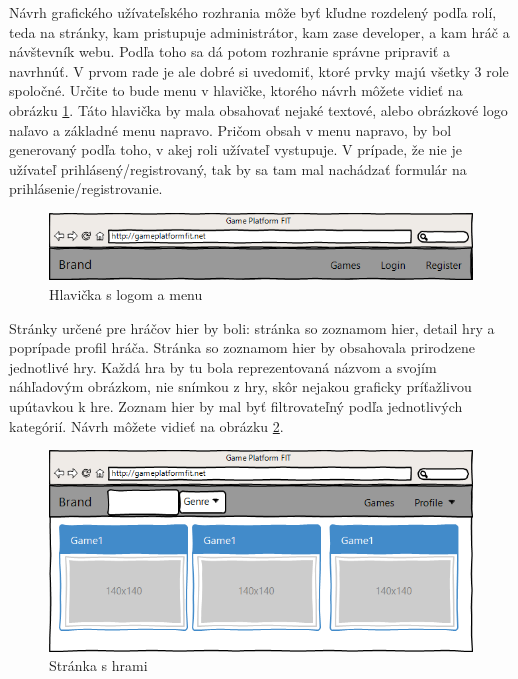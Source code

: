 Návrh grafického užívateľského rozhrania môže byť kľudne rozdelený podľa rolí, teda na stránky, kam pristupuje administrátor, kam zase developer, a kam hráč a návštevník webu. Podľa toho sa dá potom rozhranie správne pripraviť a navrhnúť. V prvom rade je ale dobré si uvedomiť, ktoré prvky majú všetky 3 role spoločné. Určite to bude menu v hlavičke, ktorého návrh môžete vidieť na obrázku \ref{fig:guihlavicka}. Táto hlavička by mala obsahovať nejaké textové, alebo obrázkové logo naľavo a základné menu napravo. Pričom obsah v menu napravo, by bol generovaný podľa toho, v akej roli užívateľ vystupuje. V prípade, že nie je užívateľ prihlásený/registrovaný, tak by sa tam mal nachádzať formulár na prihlásenie/registrovanie. 
\begin{figure}[h]
  \centering
  \includegraphics[scale=0.50]{fig/gui-hlavicka.png}
  \caption{Hlavička s logom a menu}
  \label{fig:guihlavicka}
\end{figure}

Stránky určené pre hráčov hier by boli: stránka so zoznamom hier, detail hry a poprípade profil hráča. Stránka so zoznamom hier by obsahovala prirodzene jednotlivé hry. Každá hra by tu bola reprezentovaná názvom a svojím náhľadovým obrázkom, nie snímkou z hry, skôr nejakou graficky príťažlivou upútavkou k hre. Zoznam hier by mal byť filtrovateľný podľa jednotlivých kategórií. Návrh môžete vidieť na obrázku \ref{fig:guihry}.
\begin{figure}[h]
  \centering
  \includegraphics[scale=0.48]{fig/gui-hry.png}
  \caption{Stránka s hrami}
  \label{fig:guihry}
\end{figure}

